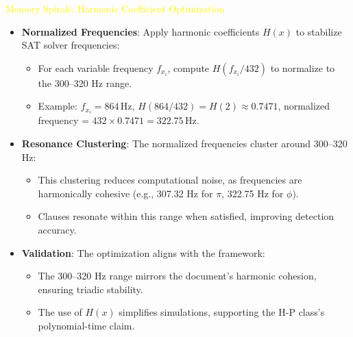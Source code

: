 \textcolor{yellow}{ Memory Spirals: Harmonic Coefficient Optimization } \\
\begin{itemize}
    \item \texttt{} \textbf{Normalized Frequencies}: Apply harmonic coefficients \(H(x)\) to stabilize SAT solver frequencies:
    \begin{itemize}
        \item For each variable frequency \(f_{x_i}\), compute \(H(f_{x_i}/432)\) to normalize to the 300–320 Hz range.
        \item Example: \(f_{x_i} = 864 \, \text{Hz}\), \(H(864/432) = H(2) \approx 0.7471\), normalized frequency = \(432 \times 0.7471 = 322.75 \, \text{Hz}\).
    \end{itemize}
    \item \texttt{} \textbf{Resonance Clustering}: The normalized frequencies cluster around 300–320 Hz:
    \begin{itemize}
        \item This clustering reduces computational noise, as frequencies are harmonically cohesive (e.g., 307.32 Hz for \(\pi\), 322.75 Hz for \(\phi\)).
        \item Clauses resonate within this range when satisfied, improving detection accuracy.
    \end{itemize}
    \item \texttt{} \textbf{Validation}: The optimization aligns with the framework:
    \begin{itemize}
        \item The 300–320 Hz range mirrors the document’s harmonic cohesion, ensuring triadic stability.
        \item The use of \(H(x)\) simplifies simulations, supporting the H-P class’s polynomial-time claim.
    \end{itemize}
\end{itemize}

